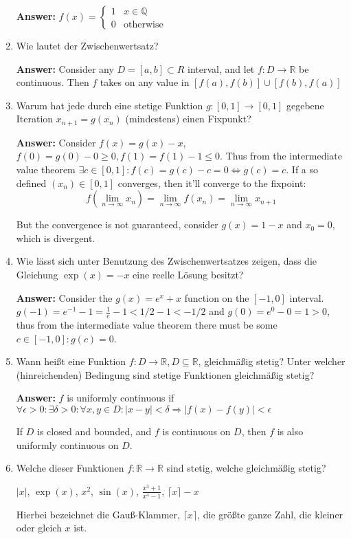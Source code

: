\documentclass[11pt]{article}
\begin{document}
\begin{enumerate}
\textbf{Answer:}
$f(x) = \begin{cases}
    1&x\in \mathbb{Q}\\
    0&\text{otherwise}
\end{cases}$

\item Wie lautet der Zwischenwertsatz?

\textbf{Answer:} Consider any $D = [a, b] \subset R$ interval, and let $f\colon D \to \mathbb{R}$ be continuous. Then $f$ takes on any value in $[f(a), f(b)] \cup [f(b), f(a)]$

\item Warum hat jede durch eine stetige Funktion $g\colon [0,1] \to [0,1]$ gegebene Iteration $x_{n+1} = g(x_n)$ (mindestens) einen Fixpunkt?

\textbf{Answer:} Consider $f(x) = g(x) - x$, $f(0) = g(0) - 0 \ge 0, f(1) = f(1) - 1 \le 0$. Thus from the intermediate value theorem $\exists c\in[0, 1]\colon f(c) = g(c) - c = 0 \Leftrightarrow g(c) = c$. If a so defined $(x_n) \in [0,1]$ converges, then it'll converge to the fixpoint:
$$f(\lim_{n\to\infty} x_n) = \lim_{n\to\infty} f(x_n) = \lim_{n\to\infty} x_{n+1}$$

But the convergence is not guaranteed, consider $g(x) = 1-x$ and $x_0 = 0$, which is divergent.


\item Wie lässt sich unter Benutzung des Zwischenwertsatzes zeigen, dass die Gleichung $\exp(x) = -x$ eine reelle Lösung besitzt?

\textbf{Answer:} Consider the $g(x) = e^x + x$ function on the $[-1, 0]$ interval. $g(-1) = e^{-1} - 1 = \frac{1}{e} - 1 < 1/2 - 1 < -1/2$ and $g(0) = e^{0} - 0 = 1 > 0$, thus from the intermediate value theorem there must be some $c \in [-1, 0]\colon g(c) = 0$.

\item Wann heißt eine Funktion $f\colon D \to \mathbb{R}, D \subseteq \mathbb{R}$, gleichmäßig stetig? Unter welcher (hinreichenden) Bedingung sind stetige Funktionen gleichmäßig stetig?

\textbf{Answer:} $f$ is uniformly continuous if $\forall \epsilon > 0\colon \exists \delta > 0\colon \forall x, y \in D\colon | x - y| < \delta \Rightarrow |f(x) - f(y) | < \epsilon$

If $D$ is closed and bounded, and $f$ is continuous on $D$, then $f$ is also uniformly continuous on $D$.

\item  Welche dieser Funktionen $f\colon \mathbb{R} \to \mathbb{R}$ sind stetig, welche gleichmäßig stetig?
 \begin{center}
    $|x|$,   $\operatorname{exp}(x)$, $x^2$, $\sin(x)$, $\frac{x^3+1}{x^4-1}$, $\lceil x \rceil - x$
\end{center}
Hierbei bezeichnet die Gauß-Klammer, $\lceil x \rceil$, die größte ganze Zahl, die kleiner oder gleich $x$ ist.


\end{enumerate}
\end{document}
